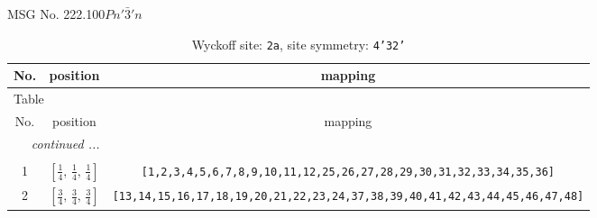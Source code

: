 \documentclass[fleqn,8pt]{jsarticle}
\begin{document}
\setcounter{MaxMatrixCols}{32}

\renewcommand{\tablename}{Table~}
\renewcommand{\figurename}{Figure~}
\begin{center}
\LARGE
MSG No. 222.100\quad$Pn'\bar{3}'n$
\end{center}
\renewcommand{\arraystretch}{1.2}
\begin{longtable}{ccc}
\caption{Wyckoff site: {\tt 2a}, site symmetry: {\tt 4'32'}}
 \\
 \hline \hline
No. & position & mapping \\ \hline \endfirsthead

\multicolumn{2}{l}{\tablename\ \thetable{}} \\
 \hline \hline
No. & position & mapping \\ \hline \endhead

 \hline \hline
\multicolumn{2}{r}{\footnotesize\it continued ...} \\ \endfoot

 \hline \hline
\multicolumn{2}{r}{} \\ \endlastfoot

1 & $\left[ \frac{1}{4},\, \frac{1}{4},\, \frac{1}{4} \right]$ & {\tt [1,2,3,4,5,6,7,8,9,10,11,12,25,26,27,28,29,30,31,32,33,34,35,36]} \\ \hline
2 & $\left[ \frac{3}{4},\, \frac{3}{4},\, \frac{3}{4} \right]$ & {\tt [13,14,15,16,17,18,19,20,21,22,23,24,37,38,39,40,41,42,43,44,45,46,47,48]} \\
\end{longtable}
\renewcommand{\arraystretch}{1.2}
\end{document}
